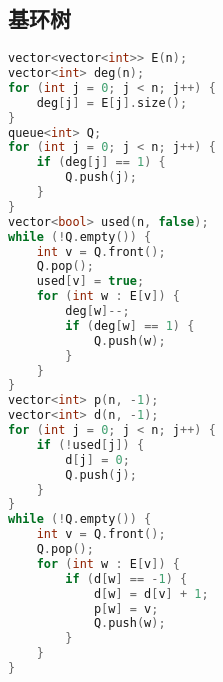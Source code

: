 \subsection{基环树}
  \begin{lstlisting}[language=c++]
vector<vector<int>> E(n);
vector<int> deg(n);
for (int j = 0; j < n; j++) {
    deg[j] = E[j].size();
}
queue<int> Q;
for (int j = 0; j < n; j++) {
    if (deg[j] == 1) {
        Q.push(j);
    }
}
vector<bool> used(n, false);
while (!Q.empty()) {
    int v = Q.front();
    Q.pop();
    used[v] = true;
    for (int w : E[v]) {
        deg[w]--;
        if (deg[w] == 1) {
            Q.push(w);
        }
    }
}
vector<int> p(n, -1);
vector<int> d(n, -1);
for (int j = 0; j < n; j++) {
    if (!used[j]) {
        d[j] = 0;
        Q.push(j);
    }
}
while (!Q.empty()) {
    int v = Q.front();
    Q.pop();
    for (int w : E[v]) {
        if (d[w] == -1) {
            d[w] = d[v] + 1;
            p[w] = v;
            Q.push(w);
        }
    }
}
  \end{lstlisting}

